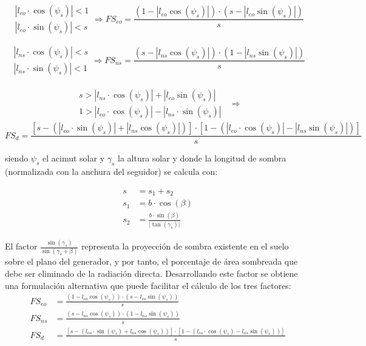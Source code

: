 \begin{equation}
\begin{array}{c}
|l_{eo}\cdot\cos(\psi_{s})|<1\\
|l_{eo}\cdot\sin(\psi_{s})|<s\end
{array}
\Rightarrow
FS_{eo}=\frac{(1-|l_{eo}\cos(\psi_{s})|)\cdot(s-|l_{eo}\sin(\psi_{s})|)}{s}
\end{equation}


\begin{equation}
\begin{array}{c}
|l_{ns}\cdot\cos(\psi_{s})|<s\\
|l_{ns}\cdot\sin(\psi_{s})|<1
\end{array}
\Rightarrow 
FS_{ns}=\frac{(s-|l_{ns}\cos(\psi_{s})|)\cdot(1-|l_{ns}\sin(\psi_{s})|)}{s}
\end{equation}


\begin{align*}
\begin{array}{c}
s>|l_{ns}\cdot\cos(\psi_{s})|+|l_{eo}\sin(\psi_{s})|\\
1>|l_{eo}\cdot\cos(\psi_{s})|-|l_{ns}\cdot\sin(\psi_{s})|
\end{array} 
& \Rightarrow
\end{align*}
\begin{equation}
FS_{d}=\frac{\left[s-\left(|l_{eo}\cdot\sin(\psi_{s})|+|l_{ns}\cos(\psi_{s})|\right)\right]\cdot\left[1-\left(|l_{eo}\cdot\cos(\psi_{s})|-|l_{ns}\sin(\psi_{s})|\right)\right]}{s}
\end{equation}


siendo $\psi_{s}$ el acimut solar y $\gamma_{s}$ la altura solar y
donde la longitud de sombra (normalizada con la anchura del seguidor) se calcula con:

\begin{align}
s & =s_{1}+s_{2}\\
s_{1} & =b\cdot\cos(\beta)\\
s_{2} & =\frac{b\cdot\sin(\beta)}{\vert\tan(\gamma_{s})\vert}
\end{align}

El factor $\frac{\sin(\gamma_{s})}{\sin(\gamma_{s}+\beta)}$ representa 
la proyección de sombra existente en el suelo sobre el plano 
del generador, y por tanto, el porcentaje de área sombreada que 
debe ser eliminado de la radiación directa. Desarrollando este factor 
se obtiene una formulación alternativa que puede facilitar el cálculo de los tres factores:
\begin{align}
FS_{eo} & =\frac{(1-l_{eo}\cos(\psi_{s}))\cdot(s-l_{eo}\sin(\psi_{s}))}{s}\\
FS_{ns} & =\frac{(s-l_{ns}\cos(\psi_{s}))\cdot(1-l_{ns}\sin(\psi_{s}))}{s}\\
FS_{d} & =\frac{\left[s-\left(l_{eo}\cdot\sin(\psi_{s})+l_{ns}\cos(\psi_{s})\right)\right]\cdot\left[1-\left(l_{eo}\cdot\cos(\psi_{s})-l_{ns}\sin(\psi_{s})\right)\right]}{s}
\end{align}

